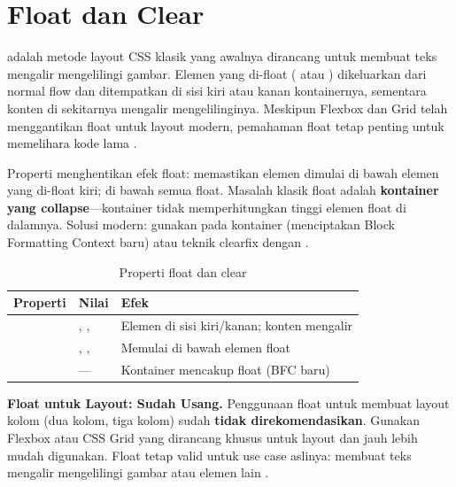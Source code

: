 ﻿\section{Float dan Clear}

 adalah metode layout CSS klasik yang awalnya dirancang untuk membuat teks mengalir mengelilingi gambar. Elemen yang di-float ( atau ) dikeluarkan dari normal flow dan ditempatkan di sisi kiri atau kanan kontainernya, sementara konten di sekitarnya mengalir mengelilinginya. Meskipun Flexbox dan Grid telah menggantikan float untuk layout modern, pemahaman float tetap penting untuk memelihara kode lama \cite{mdnCss}.

Properti  menghentikan efek float:  memastikan elemen dimulai di bawah elemen yang di-float kiri;  di bawah semua float. Masalah klasik float adalah \textbf{kontainer yang collapse}---kontainer tidak memperhitungkan tinggi elemen float di dalamnya. Solusi modern: gunakan  pada kontainer (menciptakan Block Formatting Context baru) atau teknik clearfix dengan  \cite{webdevCss}.

\begin{table}[H]
\centering
\begin{tabular}{|P{3cm}|P{4cm}|P{5cm}|}
\hline
\textbf{Properti} & \textbf{Nilai} & \textbf{Efek} \\
\hline
{} & , ,  & Elemen di sisi kiri/kanan; konten mengalir \\
\hline
{} & , ,  & Memulai di bawah elemen float \\
\hline
{} & --- & Kontainer mencakup float (BFC baru) \\
\hline
\end{tabular}
\caption{Properti float dan clear}
\end{table}

\begin{catatan}
\textbf{Float untuk Layout: Sudah Usang.} Penggunaan float untuk membuat layout kolom (dua kolom, tiga kolom) sudah \textbf{tidak direkomendasikan}. Gunakan Flexbox atau CSS Grid yang dirancang khusus untuk layout dan jauh lebih mudah digunakan. Float tetap valid untuk use case aslinya: membuat teks mengalir mengelilingi gambar atau elemen lain \cite{cssTricks}.
\end{catatan}

